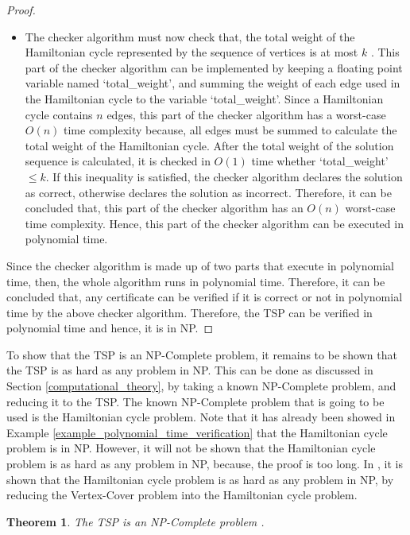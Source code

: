 \documentclass[12pt]{article}
\newtheorem{theorem}[definition]{Theorem}
\numberwithin{equation}{subsection}
\numberwithin{table}{subsection}
\numberwithin{algorithm}{subsection}
\begin{document}
\begin{proof}
\begin{itemize}
   \item The checker algorithm must now check that, the total weight of the Hamiltonian cycle represented by the sequence of vertices is at most $k$ . This part of the checker algorithm can be implemented by keeping a floating point variable named `total\_weight', and summing the weight of each edge used in the Hamiltonian cycle to the variable `total\_weight'. Since a Hamiltonian cycle contains $n$ edges, this part of the checker algorithm has a worst-case $O(n)$ time complexity because, all edges must be summed to calculate the total weight of the Hamiltonian cycle. After the total weight of the solution sequence is calculated, it is checked in $O(1)$ time whether `total\_weight' $\leq k$. If this inequality is satisfied, the checker algorithm declares the solution as correct, otherwise declares the solution as incorrect. Therefore, it can be concluded that, this part of the checker algorithm has an $O(n)$ worst-case time complexity. Hence, this part of the checker algorithm can be executed in polynomial time.
\end{itemize} 
Since the checker algorithm is made up of two parts that execute in polynomial time, then, the whole algorithm runs in polynomial time. Therefore, it can be concluded that, any certificate can be verified if it is correct or not in polynomial time by the above checker algorithm. Therefore, the TSP can be verified in polynomial time and hence, it is in NP. 
\end{proof}
To show that the TSP is an NP-Complete problem, it remains to be shown that the TSP is as hard as any problem in NP. This can be done as discussed in Section \ref{computational_theory}, by taking a known NP-Complete problem, and reducing it to the TSP. The known NP-Complete problem that is going to be used is the Hamiltonian cycle problem. Note that it has already been showed in Example \ref{example_polynomial_time_verification} that the Hamiltonian cycle problem is in NP. However, it will not be shown that the Hamiltonian cycle problem is as hard as any problem in NP, because, the proof is too long. In \cite{cormen_leiserson_rivest_stein}, it is shown that the Hamiltonian cycle problem is as hard as any problem in NP, by reducing the Vertex-Cover problem into the Hamiltonian cycle problem.
\begin{theorem}
\label{TSP_NP-Complete}
The TSP is an NP-Complete problem {}. 
\end{theorem}
\end{document}
